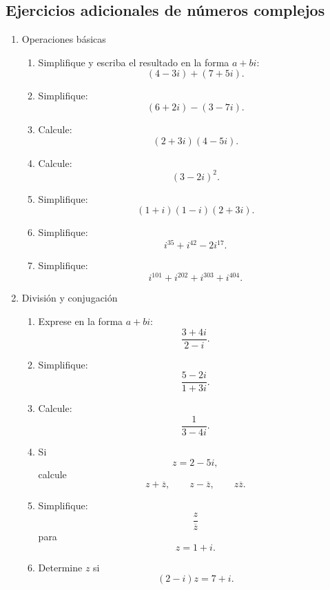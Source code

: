 \documentclass[12pt]{article}
\begin{document}
\subsection*{Ejercicios adicionales de números complejos}
\begin{enumerate}
\item Operaciones básicas

\begin{enumerate}

\item Simplifique y escriba el resultado en la forma $a+bi$:
\[
(4-3i)+(7+5i).
\]

\item Simplifique:
\[
(6+2i)-(3-7i).
\]

\item Calcule:
\[
(2+3i)(4-5i).
\]

\item Calcule:
\[
(3-2i)^2.
\]

\item Simplifique:
\[
(1+i)(1-i)(2+3i).
\]

\item Simplifique:
\[
i^{35}+i^{42}-2i^{17}.
\]

\item Simplifique:
\[
i^{101}+i^{202}+i^{303}+i^{404}.
\]

\end{enumerate}


\item División y conjugación

\begin{enumerate}

\item Exprese en la forma $a+bi$:
\[
\frac{3+4i}{2-i}.
\]

\item Simplifique:
\[
\frac{5-2i}{1+3i}.
\]

\item Calcule:
\[
\frac{1}{3-4i}.
\]

\item Si
\[
z=2-5i,
\]
calcule
\[
z+\overline z,\qquad
z-\overline z,\qquad
z\overline z.
\]

\item Simplifique:
\[
\frac{z}{\overline z}
\]
para
\[
z=1+i.
\]

\item Determine $z$ si
\[
(2-i)z=7+i.
\]

\end{enumerate}



\end{enumerate}
\end{document}
